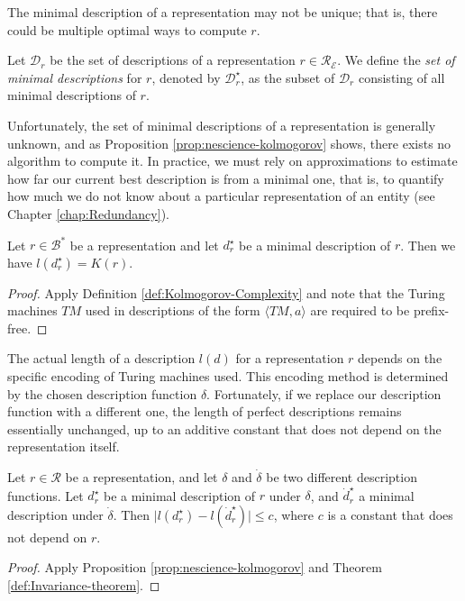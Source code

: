 The minimal description of a representation may not be unique; that is, there could be multiple optimal ways to compute $r$.

\begin{definition}
\label{def:set_descriptions_perfect_model}
Let $\mathcal{D}_r$ be the set of descriptions of a representation $r \in \mathcal{R}_\mathcal{E}$. We define the \emph{set of minimal descriptions} for $r$, denoted by $\mathcal{D}^\star_r$, as the subset of $\mathcal{D}_r$ consisting of all minimal descriptions of $r$.
\end{definition}

Unfortunately, the set of minimal descriptions of a representation is generally unknown, and as Proposition \ref{prop:nescience-kolmogorov} shows, there exists no algorithm to compute it. In practice, we must rely on approximations to estimate how far our current best description is from a minimal one, that is, to quantify how much we do not know about a particular representation of an entity (see Chapter \ref{chap:Redundancy}).

\begin{proposition}
\label{prop:nescience-kolmogorov}
Let $r \in \mathcal{B}^\ast$ be a representation and let $d_r^{\star}$ be a minimal description of $r$. Then we have $l \left( d_r^{\star} \right) = K\left( r \right)$.
\end{proposition}
\begin{proof}
Apply Definition \ref{def:Kolmogorov-Complexity} and note that the Turing machines $TM$ used in descriptions of the form $\langle TM, a \rangle$ are required to be prefix-free.
\end{proof}

The actual length of a description $l(d)$ for a representation $r$ depends on the specific encoding of Turing machines used. This encoding method is determined by the chosen description function $\delta$. Fortunately, if we replace our description function with a different one, the length of perfect descriptions remains essentially unchanged, up to an additive constant that does not depend on the representation itself.

\begin{corollary}
Let $r \in \mathcal{R}$ be a representation, and let $\delta$ and $\dot{\delta}$ be two different description functions. Let $d_r^{\star}$ be a minimal description of $r$ under $\delta$, and $\dot{d}_r^{\star}$ a minimal description under $\dot{\delta}$. Then $\mid l \left( d_r^{\star} \right) - l \left( \dot{d}_r^{\star} \right) \mid \leq c$, where $c$ is a constant that does not depend on $r$.
\end{corollary}
\begin{proof}
Apply Proposition \ref{prop:nescience-kolmogorov} and Theorem \ref{def:Invariance-theorem}.
\end{proof}

